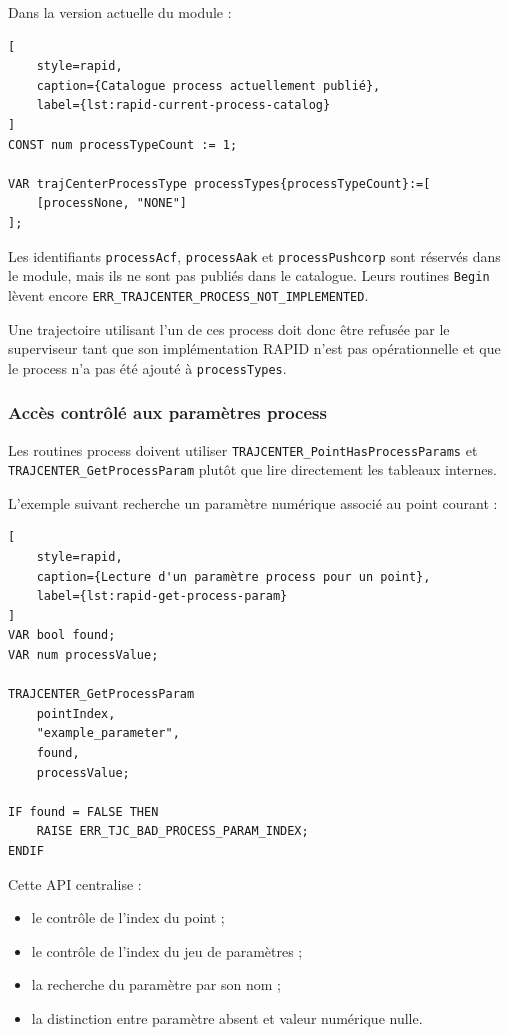 \documentclass{rapportENSAM}
\begin{document}
Dans la version actuelle du module :

\begin{lstlisting}[
    style=rapid,
    caption={Catalogue process actuellement publié},
    label={lst:rapid-current-process-catalog}
]
CONST num processTypeCount := 1;

VAR trajCenterProcessType processTypes{processTypeCount}:=[
    [processNone, "NONE"]
];
\end{lstlisting}

Les identifiants \texttt{processAcf}, \texttt{processAak} et
\texttt{processPushcorp} sont réservés dans le module, mais ils ne sont pas
publiés dans le catalogue. Leurs routines \texttt{Begin} lèvent encore
\texttt{ERR\_TRAJCENTER\_PROCESS\_NOT\_IMPLEMENTED}.

Une trajectoire utilisant l'un de ces process doit donc être refusée par le
superviseur tant que son implémentation RAPID n'est pas opérationnelle et que
le process n'a pas été ajouté à \texttt{processTypes}.


\subsubsection{Accès contrôlé aux paramètres process}
\label{subsubsec:technic-process-parameter-access}

Les routines process doivent utiliser \texttt{TRAJCENTER\_PointHasProcessParams} et \texttt{TRAJCENTER\_GetProcessParam} plutôt que lire directement les tableaux internes.

L'exemple suivant recherche un paramètre numérique associé au point courant :

\begin{lstlisting}[
    style=rapid,
    caption={Lecture d'un paramètre process pour un point},
    label={lst:rapid-get-process-param}
]
VAR bool found;
VAR num processValue;

TRAJCENTER_GetProcessParam
    pointIndex,
    "example_parameter",
    found,
    processValue;

IF found = FALSE THEN
    RAISE ERR_TJC_BAD_PROCESS_PARAM_INDEX;
ENDIF
\end{lstlisting}

Cette API centralise :

\begin{itemize}
    \item le contrôle de l'index du point ;
    \item le contrôle de l'index du jeu de paramètres ;
    \item la recherche du paramètre par son nom ;
    \item la distinction entre paramètre absent et valeur numérique nulle.
\end{itemize}
\end{document}
